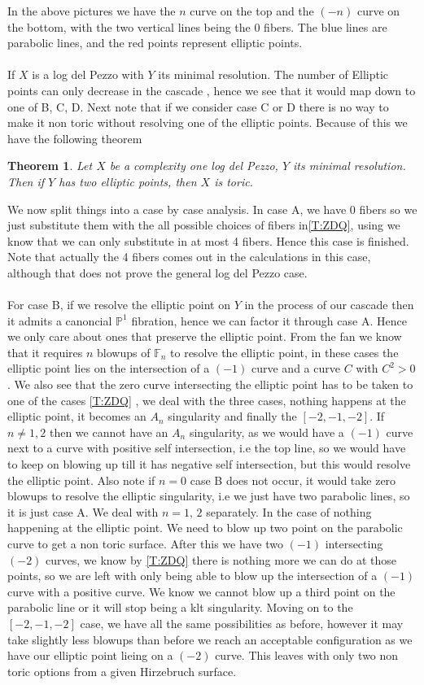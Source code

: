 \documentclass[11pt]{amsart}
\theoremstyle{plain}
\newtheorem{thm}{Theorem}[section]
\begin{document}
In the above pictures we have the $n$ curve on the top and the $(-n)$ curve on the bottom, with the two vertical lines being the 0 fibers. The blue lines are parabolic lines, and the red points represent elliptic points.
\\
\\
If $X$ is a log del Pezzo with $Y$ its minimal resolution. The number of Elliptic points can only decrease in the cascade , hence we see that it would map down to one of B, C, D. Next note that if we consider case C or D there is no way to make it non toric without resolving one of the elliptic points. Because of this we have the following theorem 
\\
\begin{thm}
Let $X$ be a complexity one log del Pezzo, $Y$ its minimal resolution. Then if $Y$ has two elliptic points, then $X$ is toric.
\end{thm}
We now split things into a case by case analysis. In case A, we have 0 fibers so we just substitute them with the all possible choices of fibers in\autoref{T:ZDQ}, using \cite{IMT} we know that we can only substitute in at most 4 fibers. Hence this case is finished. Note that actually the 4 fibers comes out in the calculations in this case, although that does not prove the general log del Pezzo case.
\\
\\
 For case B, if we resolve the elliptic point on $Y$ in the process of our cascade then it admits a canoncial $\mathbb{P}^1$ fibration, hence we can factor it through case A. Hence we only care about ones that preserve the elliptic point. From the fan we know that it requires $n$ blowups of $\mathbb{F}_n$ to resolve the elliptic point, in these cases the elliptic point lies on the intersection of a $(-1)$ curve and a curve $C$ with $C^2 > 0$. We also see that the zero curve intersecting the elliptic point has to be taken to one of the cases \autoref{T:ZDQ} , we deal with the three cases, nothing happens at the elliptic point, it becomes an $A_n$ singularity and finally the $[ -2, -1, -2]$. If $n \neq 1,2$ then we cannot have an $A_n$ singularity, as we would have a $(-1)$ curve next to a curve with positive self intersection, i.e  the top line, so we would have to keep on blowing up till it has negative self intersection, but this would resolve the elliptic point. Also note if $n=0$ case B does not occur, it would take zero blowups to resolve the elliptic singularity, i.e we just have two parabolic lines, so it is just case A. We deal with $n=1, \, 2$ separately. In the case of nothing happening at the elliptic point. We need to blow up two point on the parabolic curve to get a non toric surface. After this we have two $(-1)$ intersecting $(-2)$ curves, we know by \autoref{T:ZDQ} there is nothing more we can do at those points, so we are left with only being able to blow up the intersection of a $(-1)$ curve with a positive curve. We know we cannot blow up a third point on the parabolic line or it will stop being a klt singularity.  Moving on to the $[-2, -1, -2]$ case, we have all the same possibilities as before, however it may take slightly less blowups than before we reach an acceptable configuration as we have our elliptic point lieing on a $(-2)$ curve. This leaves with only two non toric options from a given Hirzebruch surface.
\end{document}
